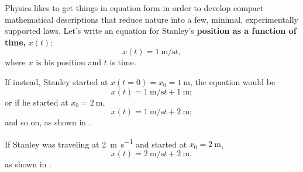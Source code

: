 \documentclass{tufte-handout}
\begin{document}
Physics likes to get things in equation form in order to develop compact mathematical descriptions that reduce nature into a few, minimal, experimentally supported laws. Let's write an equation for Stanley's \textbf{position as a function of time,} $x(t)$:
\begin{equation}
x(t) = \SI{1}{\meter\per\second} t,
\end{equation}
where $x$ is his position and $t$ is time. 

If instead, Stanley started at $x(t=0)=x_0=\SI{1}{\meter}$, the equation would be
\begin{equation}
x(t) = \SI{1}{\meter\per\second} t + \SI{1}{\meter};
\end{equation}
or if he started at $x_0=\SI{2}{\meter}$,
\begin{equation}
x(t) = \SI{1}{\meter\per\second} t + \SI{2}{\meter};
\end{equation}
and so on, as shown in .
\begin{marginfigure}
\caption{Stanley's position with different starting points (initial position $x_0$)}
\label{fig:position2}
\end{marginfigure} 

If Stanley was traveling at \SI{2}{\meter\per\second} and started at $x_0=\SI{2}{\meter}$,
\begin{equation}
x(t) = \SI{2}{\meter\per\second} t + \SI{2}{\meter},
\label{eq:position3}
\end{equation}
as shown in .
\begin{marginfigure}
\caption{Stanley's position when he is traveling at \SI{2}{\meter\per\second} and starts at $x_0=\SI{2}{\meter}$.}
\label{fig:position3}
\end{marginfigure} 
\end{document}
